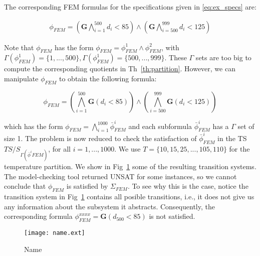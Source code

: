 \documentclass{article}
\newcommand{\Always}{\mathbf{G}}
\begin{document}
The corresponding FEM formulas for the specifications given in
\eqref{eq:ex_specs} are:

\begin{equation}
    \begin{aligned}
        \phi_{FEM} = (\Always \bigwedge_{i = 1}^{500} d_i < 85) \wedge (\Always
            \bigwedge_{i = 500}^{999} d_i < 125)
    \end{aligned}
\end{equation}

Note that $\phi_{FEM}$ has the form $\phi_{FEM} = \phi^1_{FEM} \wedge
\phi^2_{FEM}$, with $\Gamma(\phi^1_{FEM}) = \{1,...,500\}, \Gamma(\phi^1_{FEM})
= \{500,...,999\}$. These $\Gamma$ sets are too big to compute the corresponding
quotients in Th~\ref{th:partition}. However, we can manipulate $\phi_{FEM}$ to obtain the
following formula:

\begin{equation}
    \phi_{FEM} = (\bigwedge_{i = 1}^{500} \Always (d_i < 85)) \wedge
    (\bigwedge_{i = 500}^{999} \Always (d_i < 125))
\end{equation}

which has the form $\phi_{FEM} = \bigwedge_{i=1}^{1000} \bar{\phi}^i_{FEM}$ and
each subformula $\bar{\phi}^i_{FEM}$ has a $\Gamma$ set of size 1. The problem
is now reduced to check the satisfaction of $\bar{\phi}^i_{FEM}$ in the TS
$TS/S_{\Gamma(\bar{\phi}^i{FEM})}$, for all $i=1,...,1000$. We use $T =
\{10, 15, 25,...,105,110\}$ for the temperature partition. We show in
Fig~\ref{fig:ex_ts} some of the resulting transition systems. The model-checking
tool returned UNSAT for some instances, so we cannot conclude that $\phi_{FEM}$ is
satisfied by $\Sigma_{FEM}$. To see why this is the case, notice the transition
system in Fig~\ref{fig:ex_ts} contains all posible transitions, i.e., it does
not give us any information about the subsystem it abstracts. Consequently, the
corresponding formula $\phi_{FEM}^{xxxx} = \Always (d_{500} < 85)$ is not
satisfied.

\begin{figure}
    \centering
    \texttt{[image: name.ext]}
    \caption{Name}
    \label{fig:ex_ts}
\end{figure}
\end{document}

